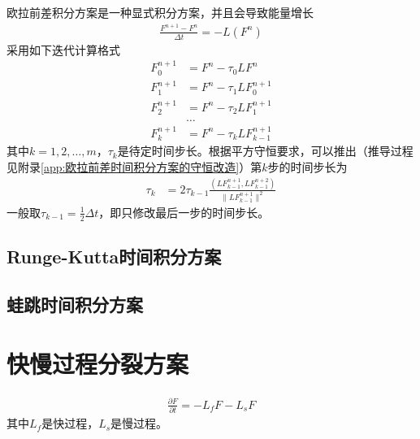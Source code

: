 \documentclass{ctexart}
\begin{document}
欧拉前差积分方案是一种显式积分方案，并且会导致能量增长
\begin{align}
  \frac{F^{n+1} - F^n}{\Delta{t}} = - L \left( F^n \right)
\end{align}
采用如下迭代计算格式
\begin{align*}
  F_0^{n+1} & = F^n - \tau_0 L F^n \\
  F_1^{n+1} & = F^n - \tau_1 L F_0^{n+1} \\
  F_2^{n+1} & = F^n - \tau_2 L F_1^{n+1} \\
  & \dots \\
  F_k^{n+1} & = F^n - \tau_k L F_{k-1}^{n+1}
\end{align*}
其中$k = 1, 2, \dots, m$，$\tau_k$是待定时间步长。根据平方守恒要求，可以推出（推导过程见附录\ref{app:欧拉前差时间积分方案的守恒改造}）第$k$步的时间步长为
\begin{align}
  \tau_k & = 2 \tau_{k-1} \frac{\left( L F_{k-1}^{n+1}, L F_{k-1}^{n+2} \right)}{\lVert L F_{k-1}^{n+1} \rVert^2}
\end{align}
一般取$\tau_{k-1} = \frac{1}{2} \Delta{t}$，即只修改最后一步的时间步长。

\subsection{Runge-Kutta时间积分方案}

\subsection{蛙跳时间积分方案}

\section{快慢过程分裂方案}

\begin{align}
  \frac{\partial F}{\partial t} = - L_f F - L_s F
\end{align}
其中$L_f$是快过程，$L_s$是慢过程。
\end{document}
